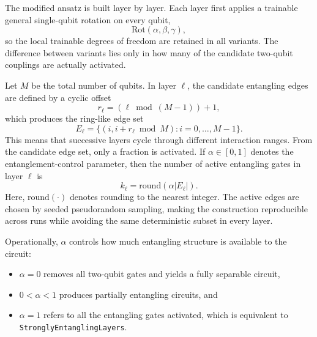 \documentclass[12pt,a4paper,openany]{report}
\begin{document}
The modified ansatz is built layer by layer. Each layer first applies a trainable general single-qubit rotation on every qubit,
\[
\mathrm{Rot}(\alpha,\beta,\gamma),
\]
so the local trainable degrees of freedom are retained in all variants. The difference between variants lies only in how many of the candidate two-qubit couplings are actually activated.

Let $M$ be the total number of qubits. In layer $\ell$, the candidate entangling edges are defined by a cyclic offset
\[
r_\ell = (\ell \bmod (M-1)) + 1,
\]
which produces the ring-like edge set
\[
E_\ell = \{(i, i+r_\ell \bmod M) : i = 0,\dots,M-1\}.
\]
This means that successive layers cycle through different interaction ranges. From the candidate edge set, only a fraction is activated. If $\alpha \in [0,1]$ denotes the entanglement-control parameter, then the number of active entangling gates in layer $\ell$ is
\[
k_\ell = \mathrm{round}(\alpha |E_\ell|).
\]
 Here, $\mathrm{round}(\cdot)$ denotes rounding to the nearest integer. The active edges are chosen by seeded pseudorandom sampling, making the construction reproducible across runs while avoiding the same deterministic subset in every layer.

Operationally, $\alpha$ controls how much entangling structure is available to the circuit:
\begin{itemize}
  \item $\alpha = 0$ removes all two-qubit gates and yields a fully separable circuit,
  \item $0 < \alpha < 1$ produces partially entangling circuits, and
  \item $\alpha = 1$ refers to all the entangling gates activated, which is equivalent to \texttt{StronglyEntanglingLayers}.
\end{itemize}
\end{document}
